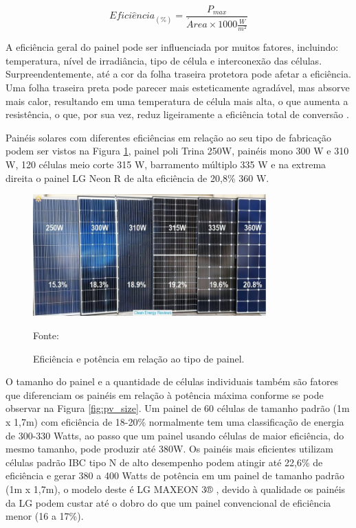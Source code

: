 \begin{equation}
    Efici \hat{e} ncia_{(\%)} = \frac{P_{max}}{\acute{A}rea \times 1000 \frac{W}{m^2}}
    \label{eq:Ef_panel}
\end{equation}

A eficiência geral do painel pode ser influenciada por muitos fatores, incluindo: temperatura, nível de irradiância, tipo de célula e interconexão das células. Surpreendentemente, até a cor da folha traseira protetora pode afetar a eficiência. Uma folha traseira preta pode parecer mais esteticamente agradável, mas absorve mais calor, resultando em uma temperatura de célula mais alta, o que aumenta a resistência, o que, por sua vez, reduz ligeiramente a eficiência total de conversão  \cite{cleanenergyreviews}.

Painéis solares com diferentes eficiências em relação ao seu tipo de fabricação podem ser vistos na Figura \ref{fig:pvs_pot}, painel poli Trina 250W, painéis mono 300 W e 310 W, 120 células meio corte 315 W, barramento múltiplo 335 W e na extrema direita o painel LG Neon R de alta eficiência de 20,8\% 360 W.

\begin{figure}[H]
    \centering
    \includegraphics[width=0.8\textwidth]{./Figuras/pvs_pot.jpg}
    \caption{Eficiência e potência em relação ao tipo de painel.}{Fonte: \cite{cleanenergyreviews}}
   \label{fig:pvs_pot}
\end{figure}

O tamanho do painel e a quantidade de células individuais também são fatores que diferenciam os painéis em relação à potência máxima conforme se pode observar na Figura \ref{fig:pv_size}. Um painel de 60 células de tamanho padrão (1m x 1,7m) com eficiência de 18-20\% normalmente tem uma classificação de energia de 300-330 Watts, ao passo que um painel usando células de maior eficiência, do mesmo tamanho, pode produzir até 380W. Os painéis mais eficientes utilizam células padrão IBC tipo N de alto desempenho podem atingir até 22,6\% de eficiência e gerar 380 a 400 Watts de potência em um painel de tamanho padrão (1m x 1,7m), o modelo deste é LG MAXEON 3® \cite{Maxeon}, devido à qualidade os painéis da LG podem custar até o dobro do que um painel convencional de eficiência menor (16 a 17\%).

